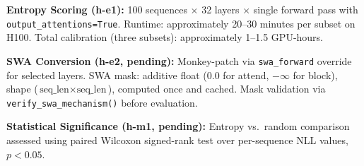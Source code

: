 \textbf{Entropy Scoring (h-e1):} 100 sequences $\times$ 32 layers $\times$ single forward pass with \texttt{output\_attentions=True}. Runtime: approximately 20--30 minutes per subset on H100. Total calibration (three subsets): approximately 1--1.5 GPU-hours.

\textbf{SWA Conversion (h-e2, pending):} Monkey-patch via \texttt{swa\_forward} override for selected layers. SWA mask: additive float (0.0 for attend, $-\infty$ for block), shape ($\text{seq\_len} \times \text{seq\_len}$), computed once and cached. Mask validation via \texttt{verify\_swa\_mechanism()} before evaluation.

\textbf{Statistical Significance (h-m1, pending):} Entropy vs.\ random comparison assessed using paired Wilcoxon signed-rank test over per-sequence NLL values, $p < 0.05$.
